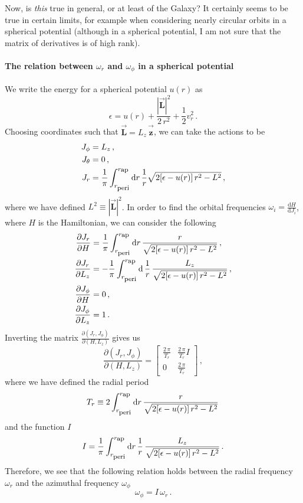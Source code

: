 \documentclass[12pt]{article}
\newcommand{\dd}{\mathrm{d}}
\newcommand{\tvector}[1]{\boldsymbol{\vec{#1}}}
\newcommand{\unitz}{\tvector{\hat{z}}}
\newcommand{\LL}{\tvector{L}}
\newcommand{\rperi}{\ensuremath{r_{\mbox{{\footnotesize peri}}}}}
\newcommand{\rap}{\ensuremath{r_{\mbox{{\footnotesize ap}}}}}
\newcommand{\matrixleft}{\left[}
\newcommand{\matrixright}{\right]}
\newcommand{\freqrfreqphiprop}{I}
\begin{document}
Now, is \emph{this} true in general, or at least of the Galaxy?  It
certainly seems to be true in certain limits, for example when
considering nearly circular orbits in a spherical potential (although
in a spherical potential, I am not sure that the matrix of derivatives
is of high rank).  

\paragraph{The relation between $\omega_r$ and
$\omega_\phi$ in a spherical potential} 
We write the energy for a spherical potential $u(r)$ as
\begin{equation}
\epsilon= u(r) + \frac{|\LL|^2}{2\,r^2} + \frac{1}{2}v_r^2\, .
\end{equation}
Choosing coordinates such that $\LL = L_z\,\unitz$, we can take the actions to be
\begin{align}
J_\phi &= L_z\, ,\\
J_\theta &=0\, ,\\
J_r &= \frac{1}{\pi} \int_{\rperi}^{\rap} \dd r\, \frac{1}{r} \sqrt{2[\epsilon-u(r)]\, r^2 - L^2}\, ,
\end{align}
where we have defined $L^2 \equiv |\LL|^2$. In order to find the
orbital frequencies $\omega_i = \frac{\dd H}{\dd J_i}$, where $H$ is
the Hamiltonian, we can consider the following
\begin{align}
\frac{\partial J_r}{\partial H} &= \frac{1}{\pi} \int_{\rperi}^{\rap} \dd r\, \frac{r}{\sqrt{2[\epsilon-u(r)]\,r^2-L^2}}\, ,\\
\frac{\partial J_r}{\partial L_z} &= -\frac{1}{\pi} \int_{\rperi}^{\rap} \dd \,\frac{1}{r}\,\frac{L_z}{\sqrt{2[\epsilon-u(r)]\,r^2-L^2}}\, ,\\
\frac{\partial J_\phi}{\partial H} &= 0\, ,\\
\frac{\partial J_\phi}{\partial L_z} &= 1\, .
\end{align}
Inverting the matrix $\frac{\partial(J_r,J_\phi)}{\partial(H,L_z)}$
gives us
\begin{equation}
\frac{\partial (J_r, J_\phi)}{\partial (H,L_z)} = \matrixleft \begin{array}{cc} \frac{2\,\pi}{T_r} & \frac{2\,\pi}{T_r}\freqrfreqphiprop  \\ 0 & \frac{2\,\pi}{T_r}\end{array}\matrixright\, ,
\end{equation}
where we have defined the radial period
\begin{equation}
T_r \equiv 2\int_{\rperi}^{\rap} \dd r\, \frac{r}{\sqrt{2[\epsilon-u(r)]\,r^2-L^2}}\,
\end{equation}
and the function $\freqrfreqphiprop$
\begin{equation}
\freqrfreqphiprop= \frac{1}{\pi} \int_{\rperi}^{\rap} \dd r\, \frac{1}{r} \, \frac{L_z}{\sqrt{2[\epsilon-u(r)]\,r^2-L^2}}\, .
\end{equation}
Therefore, we see that the following relation holds between the radial
frequency $\omega_r$ and the azimuthal frequency $\omega_\phi$
\begin{equation}
\omega_\phi = I\, \omega_r\, .
\end{equation}
\end{document}
